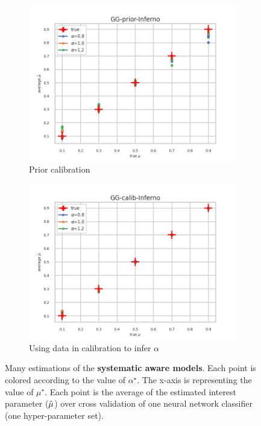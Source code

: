 \begin{figure}[ht!]
  \begin{subfigure}[t]{0.49\linewidth}
    \includegraphics[width=\linewidth]{COMPARE/GG-prior/Inferno/profusion_true_mu_target_mean.png}
    \caption{Prior calibration}
  \end{subfigure}%
  \hfill
  \begin{subfigure}[t]{0.49\linewidth}
    \includegraphics[width=\linewidth]{COMPARE/GG-calib/Inferno/profusion_true_mu_target_mean.png}
    \caption{Using data in calibration to infer $\alpha$}
  \end{subfigure}

  \caption{Many estimations of the \textbf{systematic aware models}. Each point is colored according to the value of $\alpha^\star$. The x-axis is representing the value of $\mu^\star$. Each point is the average of the estimated interest parameter ($\hat\mu$) over cross validation of one neural network classifier (one hyper-parameter set).}
  \label{fig:gg_syst_aware_compare_calib_estimator}
\end{figure}

